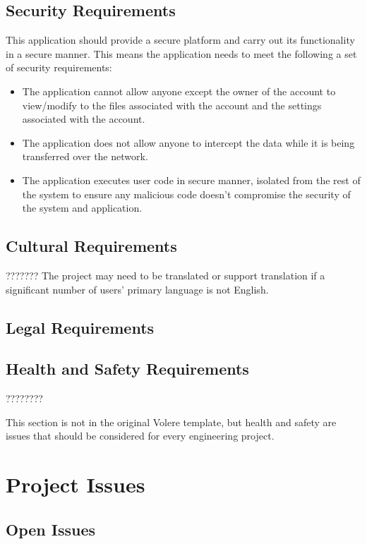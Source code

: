 \documentclass[12pt, titlepage]{article}
\begin{document}
  \subsection{Security Requirements}
  This application should provide a secure platform and carry out its
  functionality in a secure manner. This means the application needs to meet
  the following a set of security requirements:
  \begin{itemize}
    \item The application cannot allow anyone except the owner of the account
      to view/modify to the files associated with the account and the settings
      associated with the account.
    \item The application does not allow anyone to intercept the data while it
      is being transferred over the network.
    \item The application executes user code in secure manner, isolated from
      the rest of the system to ensure any malicious code doesn't compromise
      the security of the system and application.
  \end{itemize}

  \subsection{Cultural Requirements}
  {\huge ???????}
  The project may need to be translated or support translation if a significant
  number of users' primary language is not English.

  \subsection{Legal Requirements}

  \subsection{Health and Safety Requirements}
  {\huge ????????}

  This section is not in the original Volere template, but health and safety are
  issues that should be considered for every engineering project.

\section{Project Issues}

  \subsection{Open Issues}
\end{document}
